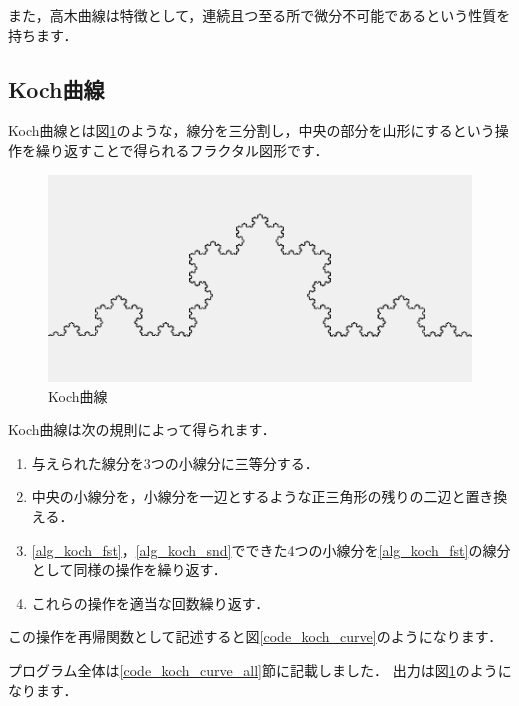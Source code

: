 \documentclass[dvipdfmx]{jsarticle}
\theoremstyle{definition}
\begin{document}
また，高木曲線は特徴として，連続且つ至る所で微分不可能であるという性質を持ちます．


\subsection{Koch曲線}

Koch曲線とは図\ref{pic_koch_curve}のような，線分を三分割し，中央の部分を山形にするという操作を繰り返すことで得られるフラクタル図形です．

\begin{figure}[ht]
\begin{center}
    \includegraphics[scale=0.20]{figure/koch_curve.png}
\end{center}
\caption{Koch曲線}
\label{pic_koch_curve}
\end{figure}

Koch曲線は次の規則によって得られます．
\begin{enumerate}
    \item 与えられた線分を3つの小線分に三等分する．  \label{alg_koch_fst}
    \item 中央の小線分を，小線分を一辺とするような正三角形の残りの二辺と置き換える．  \label{alg_koch_snd}
    \item \ref{alg_koch_fst}，\ref{alg_koch_snd}でできた4つの小線分を\ref{alg_koch_fst}の線分として同様の操作を繰り返す．
    \item これらの操作を適当な回数繰り返す．
\end{enumerate}

この操作を再帰関数として記述すると図\ref{code_koch_curve}のようになります．

プログラム全体は\ref{code_koch_curve_all}節に記載しました．
出力は図\ref{pic_koch_curve}のようになります．
\end{document}
